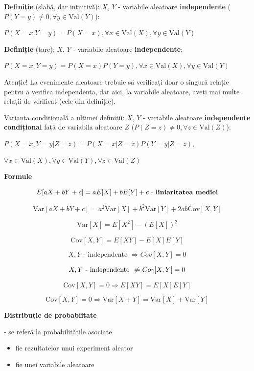 \documentclass[12pt]{article}
\begin{document}
	\textbf{Definiție} (slabă, dar intuitivă):
	$X$, $Y$ - variabile aleatoare \textbf{independente} ($P(Y = y) \neq 0, \forall y \in \text{Val}(Y)$): 
	
	$P(X = x|Y = y) = P(X = x), \forall x \in \text{Val}(X), \forall y \in \text{Val}(Y)$
	
	\textbf{Definiție} (tare):
	$X$, $Y$ - variabile aleatoare \textbf{independente}: 
	
	$P(X = x, Y = y) = P(X = x) P(Y = y), \forall x \in \text{Val}(X), \forall y \in \text{Val}(Y)$
	
	Atenție! La evenimente aleatoare trebuie să verificați doar o singură relație pentru a verifica independența, dar aici, la variabile aleatoare, aveți mai multe relații de verificat (cele din definiție).
	
	Varianta condițională a ultimei definiții:
	$X$, $Y$ - variabile aleatoare \textbf{independente condițional} față de variabila aleatoare $Z$ ($P(Z=z)\neq 0, \forall z\in \text{Val}(Z)$): 
	
	$P(X = x, Y = y|Z=z) = P(X = x|Z=z) P(Y = y|Z=z)$, 
	
	$\forall x \in \text{Val}(X), \forall y \in \text{Val}(Y), \forall z \in \text{Val}(Z)$
	
	\textbf{\large{Formule}}
	
	$$E[aX+bY+c] = aE[X] + bE[Y] + c\text{ - \textbf{liniaritatea mediei}}$$
	
	$$\text{Var}[aX+bY+c] = a^2\text{Var}[X] + b^2\text{Var}[Y] + 2ab\text{Cov}[X,Y]$$
	
	$$\text{Var}[X] = E[X^2] - (E[X])^2$$
	
	$$\text{Cov}[X,Y] = E[XY] - E[X]E[Y]$$
	
	$$X,Y\text{ - independente }\Rightarrow Cov[X,Y]=0$$
	
	$$X,Y\text{ - independente }\centernot\Leftarrow Cov[X,Y]=0$$
	
	$$\text{Cov}[X,Y] = 0 \Rightarrow E[XY] = E[X] E[Y]$$
	
	$$\text{Cov}[X,Y] = 0 \Rightarrow \text{Var}[X+Y] = \text{Var}[X] + \text{Var}[Y]$$
	
	\textbf{\large{Distribuție de probabiitate}}
	
	- se referă la probabilitățile asociate
	\begin{itemize}
		\item fie rezultatelor unui experiment aleator
		\item fie unei variabile aleatoare
	\end{itemize}
	
\end{document}
